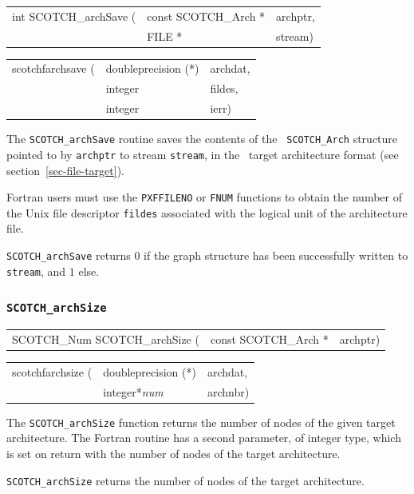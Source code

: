 \begin{itemize}
\progsyn

{\tt\begin{tabular}{l@{}ll}
int SCOTCH\_archSave ( & const SCOTCH\_Arch * & archptr, \\
                       & FILE *               & stream)
\end{tabular}}

{\tt\begin{tabular}{l@{}ll}
scotchfarchsave ( & doubleprecision (*) & archdat, \\
                  & integer             & fildes, \\
                  & integer             & ierr)
\end{tabular}}

\progdes

The {\tt SCOTCH\_archSave} routine saves the contents of the {\tt
SCOTCH\_\lbt Arch} structure pointed to by {\tt archptr} to stream
{\tt stream}, in the \scotch\ target architecture format (see
section~\ref{sec-file-target}).

Fortran users must use the {\tt PXFFILENO} or {\tt FNUM} functions to
obtain the number of the Unix file descriptor {\tt fildes} associated
with the logical unit of the architecture file.

\progret

{\tt SCOTCH\_archSave} returns $0$ if the graph structure has been
successfully written to {\tt stream}, and $1$ else.
\end{itemize}

\subsubsection{{\tt SCOTCH\_archSize}}

\begin{itemize}
\progsyn

{\tt\begin{tabular}{l@{}ll}
SCOTCH\_Num SCOTCH\_archSize ( & const SCOTCH\_Arch * & archptr)
\end{tabular}}

{\tt\begin{tabular}{l@{}ll}
scotchfarchsize ( & doubleprecision (*) & archdat, \\
                  & integer*{\it num}   & archnbr)
\end{tabular}}

\progdes

The {\tt SCOTCH\_archSize} function returns the number of nodes of
the given target architecture. The Fortran routine has a second
parameter, of integer type, which is set on return with the number
of nodes of the target architecture.

\progret

{\tt SCOTCH\_archSize} returns the number of nodes of the target
architecture.
\end{itemize}

